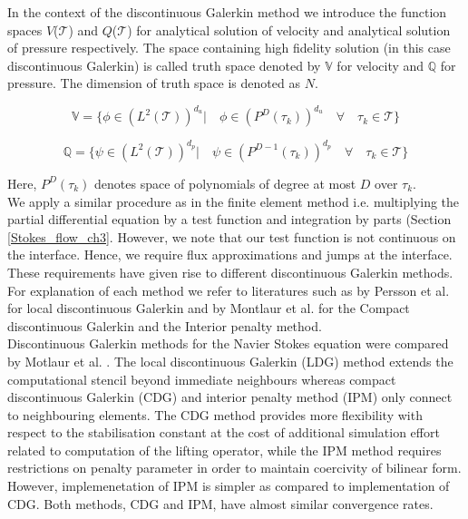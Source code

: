 \documentclass[a4paper,openany]{book}
\begin{document}
In the context of the discontinuous Galerkin method we introduce the function spaces $V$($\mathcal{T}$) and $Q$($\mathcal{T}$) for analytical solution of velocity and analytical solution of pressure respectively. The space containing high fidelity solution (in this case discontinuous Galerkin) is called truth space denoted by $\mathbb{V}$ for velocity and $\mathbb{Q}$ for pressure. The dimension of truth space is denoted as $N$. 

\begin{equation} \label{velocity_test}
\mathbb{V} = \lbrace \phi \in (L^2(\mathcal{T}))^{d_u}| \quad \phi \in (P^D(\tau_k))^{d_u} \quad \forall \quad {\tau_k} \in \mathcal{T} \rbrace
\end{equation}

\begin{equation} \label{pressure_test}
\mathbb{Q} = \lbrace \psi \in (L^2(\mathcal{T}))^{d_p}| \quad \psi \in (P^{D-1}(\tau_k))^{d_p} \quad \forall \quad {\tau_k} \in \mathcal{T} \rbrace
\end{equation}

Here, $P^D(\tau_k)$ denotes space of polynomials of degree at most $D$ over $\tau_k$.\\

We apply a similar procedure as in the finite element method i.e. multiplying the partial differential equation by a test function and integration by parts (Section \ref{Stokes_flow_ch3}. However, we note that our test function is not continuous on the interface. Hence, we require flux approximations and jumps at the interface. These requirements have given rise to different discontinuous Galerkin methods. For explanation of each method we refer to literatures such as by Persson et al. \cite{persson} for local discontinuous Galerkin and by Montlaur et al. \cite{Montlaur} for the Compact discontinuous Galerkin and the Interior penalty method. \\

Discontinuous Galerkin methods for the Navier Stokes equation were compared by Motlaur et al. \cite{Montlaur}. The local discontinuous Galerkin (LDG) method extends the computational stencil beyond immediate neighbours whereas compact discontinuous Galerkin (CDG) and interior penalty method (IPM) only connect to neighbouring elements. The CDG method provides more flexibility with respect to the stabilisation constant at the cost of additional simulation effort related to computation of the lifting operator, while the IPM method requires restrictions on penalty parameter in order to maintain coercivity of bilinear form. However, implemenetation of IPM is simpler as compared to implementation of CDG. Both methods, CDG and IPM, have almost similar convergence rates. 
\end{document}
